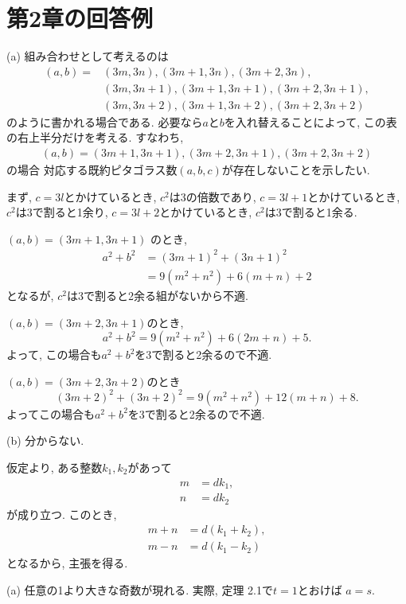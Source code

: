 \section{第2章の回答例} %

\noindent {} \indent %
\noindent (a) 組み合わせとして考えるのは
\begin{align*}
(a, b) =& (3m, 3n), (3m+1, 3n), (3m+2, 3n), \\
        & (3m, 3n+1), (3m+1, 3n+1), (3m+2, 3n+1), \\
        & (3m, 3n+2), (3m+1, 3n+2), (3m+2, 3n+2)
\end{align*}
のように書かれる場合である.
必要なら$a$と$b$を入れ替えることによって, この表の右上半分だけを考える.
すなわち,
\begin{align*}
(a, b) = (3m+1, 3n+1), (3m+2, 3n+1), (3m+2, 3n+2)
\end{align*}
の場合 対応する既約ピタゴラス数$(a, b, c)$が存在しないことを示したい.

まず, $c = 3l$とかけているとき, $c^2$は3の倍数であり,
$c = 3l+1$とかけているとき, $c^2$は3で割ると1余り,
$c = 3l+2$とかけているとき, $c^2$は3で割ると1余る.

\noindent $(a, b) = (3m+1, 3n+1)$ のとき,
\begin{align*}
a^2 + b^2
  &= (3m+1)^2 + (3n+1)^2 \\
  &= 9(m^2 + n^2) + 6(m+n) + 2
\end{align*}
となるが, $c^2$は3で割ると2余る組がないから不適.

\noindent $(a, b) = (3m+2, 3n+1)$のとき,
\[
  a^2 + b^2 = 9(m^2 + n^2) + 6(2m + n) + 5.
\]
よって, この場合も$a^2 + b^2$を3で割ると2余るので不適.

\noindent $(a, b) = (3m+2, 3n+2)$のとき
\[
  (3m+2)^2 + (3n+2)^2 = 9(m^2 + n^2) + 12(m+n) + 8.
\]
よってこの場合も$a^2 + b^2$を3で割ると2余るので不適.

(b) 分からない.

仮定より, ある整数$k_1, k_2$があって
\begin{align*}
  m &= dk_1, \\
  n &= dk_2
\end{align*}
が成り立つ.
このとき,
\begin{align*}
  m + n &= d(k_1 + k_2), \\
  m - n &= d(k_1 - k_2)
\end{align*}
となるから, 主張を得る.

 \indent %
(a) 任意の1より大きな奇数が現れる.
実際, 定理 2.1で$t=1$とおけば $a = s$.

